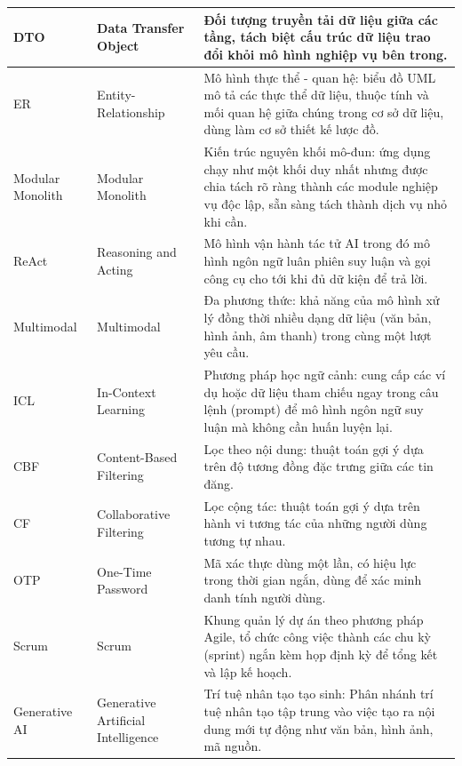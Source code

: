 \begin{longtable}{|L{0.18\textwidth}|L{0.27\textwidth}|L{0.49\textwidth}|}
DTO & Data Transfer Object & Đối tượng truyền tải dữ liệu giữa các tầng, tách biệt cấu trúc dữ liệu trao đổi khỏi mô hình nghiệp vụ bên trong. \\
\hline

ER & Entity-Relationship & Mô hình thực thể - quan hệ: biểu đồ UML mô tả các thực thể dữ liệu, thuộc tính và mối quan hệ giữa chúng trong cơ sở dữ liệu, dùng làm cơ sở thiết kế lược đồ. \\
\hline

Modular Monolith & Modular Monolith & Kiến trúc nguyên khối mô-đun: ứng dụng chạy như một khối duy nhất nhưng được chia tách rõ ràng thành các module nghiệp vụ độc lập, sẵn sàng tách thành dịch vụ nhỏ khi cần. \\
\hline

ReAct & Reasoning and Acting & Mô hình vận hành tác tử AI trong đó mô hình ngôn ngữ luân phiên suy luận và gọi công cụ cho tới khi đủ dữ kiện để trả lời. \\
\hline

Multimodal & Multimodal & Đa phương thức: khả năng của mô hình xử lý đồng thời nhiều dạng dữ liệu (văn bản, hình ảnh, âm thanh) trong cùng một lượt yêu cầu. \\
\hline

ICL & In-Context Learning & Phương pháp học ngữ cảnh: cung cấp các ví dụ hoặc dữ liệu tham chiếu ngay trong câu lệnh (prompt) để mô hình ngôn ngữ suy luận mà không cần huấn luyện lại. \\
\hline

CBF & Content-Based Filtering & Lọc theo nội dung: thuật toán gợi ý dựa trên độ tương đồng đặc trưng giữa các tin đăng. \\
\hline

CF & Collaborative Filtering & Lọc cộng tác: thuật toán gợi ý dựa trên hành vi tương tác của những người dùng tương tự nhau. \\
\hline

OTP & One-Time Password & Mã xác thực dùng một lần, có hiệu lực trong thời gian ngắn, dùng để xác minh danh tính người dùng. \\
\hline

Scrum & Scrum & Khung quản lý dự án theo phương pháp Agile, tổ chức công việc thành các chu kỳ (sprint) ngắn kèm họp định kỳ để tổng kết và lập kế hoạch. \\
\hline

Generative AI & Generative Artificial Intelligence & Trí tuệ nhân tạo tạo sinh: Phân nhánh trí tuệ nhân tạo tập trung vào việc tạo ra nội dung mới tự động như văn bản, hình ảnh, mã nguồn. \\
\hline


\end{longtable}

